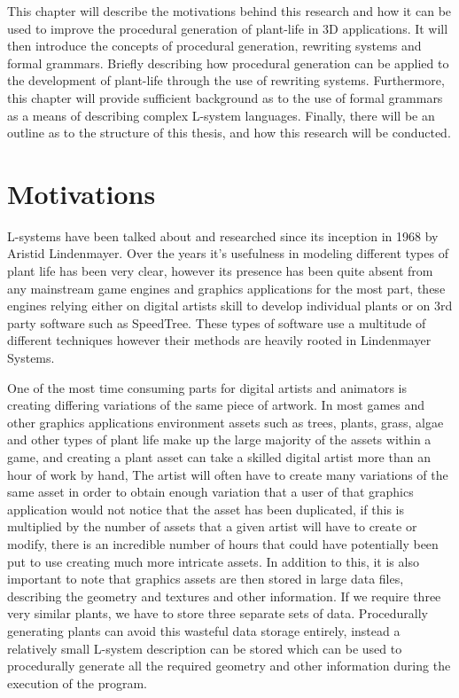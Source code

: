This chapter will describe the motivations behind this research and how it can be used to improve the procedural generation of plant-life in 3D applications. It will then introduce the concepts of procedural generation, rewriting systems and formal grammars. Briefly describing how procedural generation can be applied to the development of plant-life through the use of rewriting systems. Furthermore, this chapter will provide sufficient background as to the use of formal grammars as a means of describing complex L-system languages. Finally, there will be an outline as to the structure of this thesis, and how this research will be conducted.

\section{Motivations}

L-systems have been talked about and researched since its inception in 1968 by Aristid Lindenmayer. Over the years it's usefulness in modeling different types of plant life has been very clear, however its presence has been quite absent from any mainstream game engines and graphics applications for the most part, these engines relying either on digital artists skill to develop individual plants or on 3rd party software such as SpeedTree. These types of software use a multitude of different techniques however their methods are heavily rooted in Lindenmayer Systems. 
 
One of the most time consuming parts for digital artists and animators is creating differing variations of the same piece of artwork. In most games and other graphics applications environment assets such as trees, plants, grass, algae and other types of plant life make up the large majority of the assets within a game, and creating a plant asset can take a skilled digital artist more than an hour of work by hand, The artist will often have to create many variations of the same asset in order to obtain enough variation that a user of that graphics application would not notice that the asset has been duplicated, if this is multiplied by the number of assets that a given artist will have to create or modify, there is an incredible number of hours that could have potentially been put to use creating much more intricate assets. In addition to this, it is also important to note that graphics assets are then stored in large data files, describing the geometry and textures and other information. If we require three very similar plants, we have to store three separate sets of data. Procedurally generating plants can avoid this wasteful data storage entirely, instead a relatively small L-system description can be stored which can be used to procedurally generate all the required geometry and other information during the execution of the program.\\

